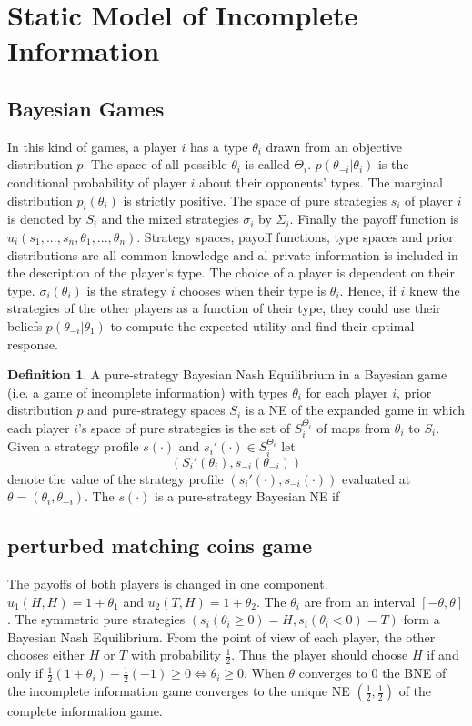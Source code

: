 \documentclass[a4paper, 12pt]{article}
\theoremstyle{plain}
\theoremstyle{definition}
\newtheorem{definition}[theorem]{Definition} %
\theoremstyle{lemma}
\theoremstyle{remark}
\theoremstyle{corollary}
\theoremstyle{example}
\begin{document}
	\section{Static Model of Incomplete Information}
	\subsection{Bayesian Games}
	In this kind of games, a player $i$ has a type $\theta_i$ drawn from an objective distribution $p$. The space of all possible $\theta_i$ is called $\Theta_i$. $p(\theta_{-i}|\theta_i)$ is the conditional probability of player $i$ about their opponents' types. The marginal distribution $p_i(\theta_i)$ is strictly positive. The space of pure strategies $s_i$ of player $i$ is denoted by $S_i$ and the mixed strategies $\sigma_i$ by $\Sigma_i$. Finally the payoff function is $u_i(s_1,...,s_n,\theta_1,...,\theta_n)$. Strategy spaces, payoff functions, type spaces and prior distributions are all common knowledge and al private information is included in the description of the player's type. The choice of a player is dependent on their type. $\sigma_i(\theta_i)$ is the strategy $i$ chooses when their type is $\theta_i$. Hence, if $i$ knew the strategies of the other players as a function of their type, they could use their beliefs $p(\theta_{-i}|\theta_1)$ to compute the expected utility and find their optimal response.
	\begin{definition}
		A pure-strategy Bayesian Nash Equilibrium in a Bayesian game (i.e. a game of incomplete information) with types $\theta_i$ for each player $i$, prior distribution $p$ and pure-strategy spaces $S_i$ is a NE of the expanded game in which each player $i$'s space of pure strategies is the set of $S_i^{\Theta_i}$ of maps from $\theta_i$ to $S_i$.\\
		Given a strategy profile $s(\cdot)$ and $s_i'(\cdot)\in S_i^{\Theta_i}$ let \[(S_i'(\theta_i),s_{-i}(\theta_{-i}))\] denote the value of the strategy profile $(s_i'(\cdot),s_{-i}(\cdot))$ evaluated at $\theta = (\theta_i, \theta_{-i})$. The $s(\cdot)$ is a pure-strategy Bayesian NE if 
	\end{definition}
	\subsection{perturbed matching coins game}
	The payoffs of both players is changed in one component.\\$u_1(H,H) = 1+\theta_1$ and $u_2(T,H) = 1+\theta_2$. The $\theta_i$ are from an interval $[-\theta,\theta]$. The symmetric pure strategies $(s_i(\theta_i \geq 0) = H, s_i(\theta_i < 0) = T)$ form a Bayesian Nash Equilibrium. From the point of view of each player, the other chooses either $H$ or $T$ with probability $\frac{1}{2}$. Thus the player should choose $H$ if and only if $\frac{1}{2}(1+\theta_i) + \frac{1}{2}(-1) \geq 0 \Leftrightarrow \theta_i \geq 0$. When $\theta$ converges to $0$ the BNE of the incomplete information game converges to the unique NE $(\frac{1}{2},\frac{1}{2})$ of the complete information game.
\end{document}

